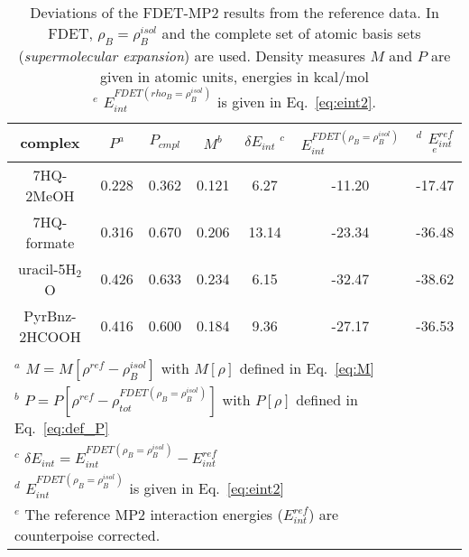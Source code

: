 \documentclass[amsmath,amssymb,preprint,aip,jcp]{revtex4-1}
\newcommand{\nr}[1]{\color{red}#1\color{black}}
\begin{document}
\begin{table*}
{
\begin{center}
\begin{tabular}{|c|c|c|c|c|c|c|}
\hline
 complex & $P^a$ & $P_{cmpl}$ & $M^b$ & $\delta E_{int}\;^c$&$E^{FDET(\rho_B=\rho_B^{isol})}_{int}$ &$^d$ $E_{int}^{ref}$ $^e$ \\ \hline
7HQ-2MeOH & 0.228 & 0.362 & 0.121 & 6.27 & -11.20 & -17.47 \\ \hline
7HQ-formate & 0.316 & 0.670 & 0.206 &  13.14 & -23.34 & -36.48 \\ \hline
uracil-5H$_2$O & 0.426 & 0.633 & 0.234 & 6.15 & -32.47 & -38.62 \\ \hline
PyrBnz-2HCOOH  & 0.416 & 0.600 & 0.184 & 9.36 & -27.17 &  -36.53 \\ \hline
\multicolumn{6}{c}{ } \\
\multicolumn{6}{l}{$^a$ $M=M[\rho^{ref} - \rho^{isol}_{B}]$ with $M[\rho]$ defined in Eq.~\ref{eq:M}}\\
\multicolumn{6}{l}{$^b$ $P=P[\rho^{ref} - \rho_{tot}^{FDET(\rho_B=\rho_B^{isol})}]$ with $P[\rho]$ defined in Eq.~\ref{eq:def_P}}\\
\multicolumn{6}{l}{$^c$ $\delta E_{int}=E^{FDET(\rho_B=\rho_B^{isol})}_{int}-E_{int}^{ref}$} \\
\multicolumn{6}{l}{$^d$ $E^{FDET(\rho_B=\rho_B^{isol})}_{int}$ is given in Eq.~\ref{eq:eint2}}\\
\multicolumn{6}{l}{$^e$ The reference MP2 interaction energies ($E_{int}^{ref}$) are \nr{counterpoise } corrected.}
\end{tabular}
\end{center}
}%
\caption{Deviations of the FDET-MP2 results from the reference data.  In FDET, $\rho_B=\rho_B^{isol}$  and the complete set of atomic basis sets ({\it supermolecular expansion}) are used. 
Density measures $M$ and $P$ are given in atomic units, energies in kcal/mol\\
$^e$ $E^{FDET(rho_B=\rho_B^{isol})}_{int}$ is given in Eq.~\ref{eq:eint2}.
}
\label{table:SE_isol}
\end{table*}
\end{document}
